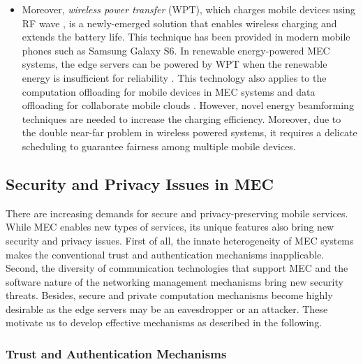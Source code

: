 \documentclass[journal]{IEEEtran}
\begin{document}
{\begin{itemize}
\item Moreover, \emph{wireless power transfer} (WPT), which charges mobile devices using RF wave \cite{Brown198409,HJuTWC1401}, is a newly-emerged solution that enables wireless charging and extends the battery life. This technique has been provided in modern mobile phones such as Samsung Galaxy S6. In renewable energy-powered MEC systems, the edge servers can be powered by WPT when the renewable energy is insufficient for reliability \cite{HKBTWC14}. This technology also applies to the computation offloading for mobile devices in MEC systems \cite{you2016energyJSAC} and data offloading for collaborate mobile clouds \cite{chang2016energy}. However, novel energy beamforming techniques are needed to increase the charging efficiency. Moreover, due to the double near-far problem in wireless powered systems, it requires a delicate scheduling to guarantee fairness among multiple mobile devices.
\end{itemize}

\subsection{Security and Privacy Issues in MEC}

There are increasing demands for secure and privacy-preserving mobile services. While MEC enables new types of services, its unique features also bring new security and privacy issues. First of all, the innate heterogeneity of MEC systems makes the conventional trust and authentication mechanisms inapplicable. Second, the diversity of communication technologies that support MEC and the software nature of the networking management mechanisms bring new security threats. Besides, secure and private computation mechanisms become highly desirable as the edge servers may be an eavesdropper or an attacker. These motivate us to develop effective mechanisms as described in the following.

\subsubsection{\textbf{Trust and Authentication Mechanisms}}

}
\end{document}
